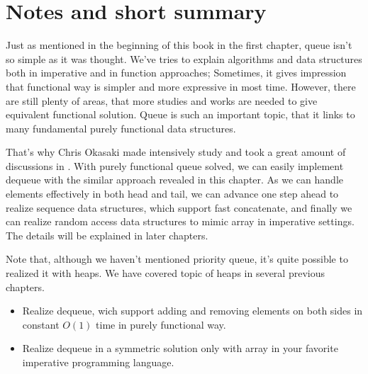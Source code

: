 \documentclass[UTF8]{article}
\begin{document}
\section{Notes and short summary}
Just as mentioned in the beginning of this book in the first chapter,
queue isn't so simple as it was thought. We've tries to explain
algorithms and data structures both in imperative and in function
approaches; Sometimes, it gives impression that functional way is
simpler and more expressive in most time. However, there are still
plenty of areas, that more studies and works are needed to give equivalent
functional solution. Queue is such an important topic, that it
links to many fundamental purely functional data structures.

That's why Chris Okasaki made intensively study and took a great
amount of discussions in \cite{okasaki-book}. With purely functional
queue solved, we can easily implement dequeue with the similar
approach revealed in this chapter. As we can handle elements effectively
in both head and tail, we can advance one step ahead to realize
sequence data structures, which support fast concatenate, and
finally we can realize random access data structures to mimic
array in imperative settings. The details will be explained
in later chapters.

Note that, although we haven't mentioned priority queue, it's quite
possible to realized it with heaps. We have covered topic of heaps
in several previous chapters.

\begin{Exercise}
\begin{itemize}
\item Realize dequeue, wich support adding and removing elements on both sides in
constant $O(1)$ time in purely functional way.
\item Realize dequeue in a symmetric solution only with array in your
favorite imperative programming language.
\end{itemize}
\end{Exercise}

\end{document}
